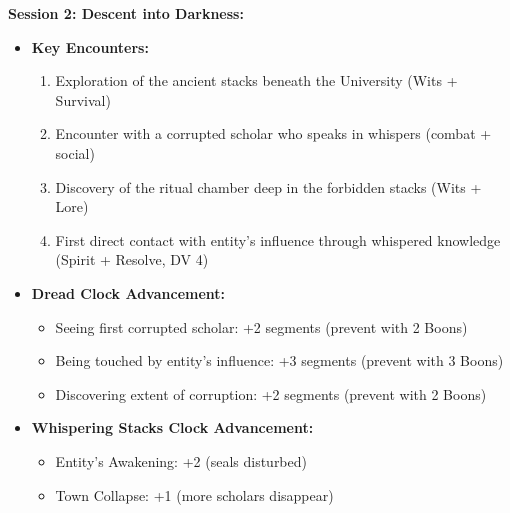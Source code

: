 \documentclass[11pt]{article}
\begin{document}
\textbf{Session 2: Descent into Darkness:}
\begin{itemize}
    \item \textbf{Key Encounters:}
    \begin{enumerate}
        \item Exploration of the ancient stacks beneath the University (Wits + Survival)
        \item Encounter with a corrupted scholar who speaks in whispers (combat + social)
        \item Discovery of the ritual chamber deep in the forbidden stacks (Wits + Lore)
        \item First direct contact with entity's influence through whispered knowledge (Spirit + Resolve, DV 4)
    \end{enumerate}
    \item \textbf{Dread Clock Advancement:}
    \begin{itemize}
        \item Seeing first corrupted scholar: +2 segments (prevent with 2 Boons)
        \item Being touched by entity's influence: +3 segments (prevent with 3 Boons)
        \item Discovering extent of corruption: +2 segments (prevent with 2 Boons)
    \end{itemize}
    \item \textbf{Whispering Stacks Clock Advancement:}
    \begin{itemize}
        \item Entity's Awakening: +2 (seals disturbed)
        \item Town Collapse: +1 (more scholars disappear)
    \end{itemize}
\end{itemize}
\end{document}
